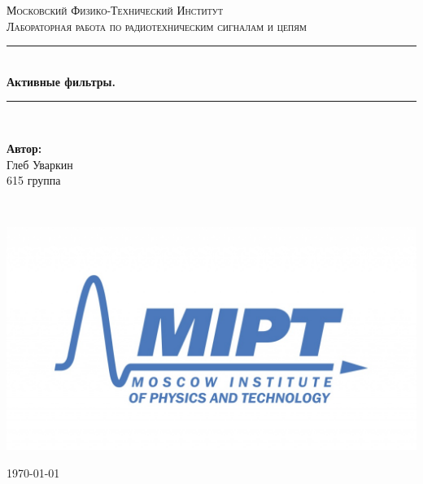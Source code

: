 \documentclass[a4paper, 12pt, twoside]{article}
\newenvironment{bottompar}{\par\vspace*{\fill}}{\clearpage}
\begin{document}
\begin{titlepage}

\newcommand{\HRule}{\rule{\linewidth}{0.7mm}} %

\center %
 

\textsc{\LARGE Московский Физико-Технический Институт}\\[1,5cm] %

\textsc{\large Лабораторная работа по радиотехническим сигналам и цепям}\\[0.5cm] %


\HRule
\\[0.4cm]
{ \huge \bfseries Активные фильтры.}
\\[0.4cm] %
\HRule
\\[1.5cm]


 


	\begin{center} \large
		\textbf{Автор:}\\
		Глеб Уваркин \\
		615 группа
	\end{center}

~


\begin{bottompar}
	\begin{center}
		\includegraphics[width = 80 mm]{logo.jpg}
	\end{center}
	{\large \today}

\end{bottompar}
\vfill %

\end{titlepage}
\end{document}
